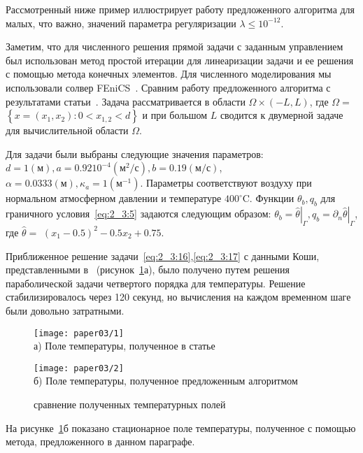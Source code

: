 Рассмотренный ниже пример иллюстрирует работу предложенного
алгоритма для малых, что важно, значений параметра регуляризации
$\lambda \leq 10^{-12}$.


Заметим, что для численного решения прямой задачи с заданным управлением
был использован метод простой итерации для линеаризации задачи и ее решения
с помощью метода конечных элементов.
Для численного моделирования мы использовали солвер FEniCS~\cite{fenics, dolfin}.
Сравним работу предложенного
алгоритма с результатами статьи~\cite{Chebotarev2019Problem}.
Задача рассматривается в области $\Omega \times(-L, L)$,
где $\Omega=$ $\left\{x=\left(x_{1}, x_{2}\right): 0<x_{1,2}<d\right\}$
и при большом $L$ сводится к двумерной задаче для вычислительной
области $\Omega$.

Для задачи были выбраны следующие значения параметров:
$d=1(\text{м}), a=0.9210^{-4}(\text{м}^{2} / \text{с}),
b=0.19(\text{м} / \text{с})$, $\alpha=0.0333(\text{м}),
\kappa_{a}=1\left(\text{м}^{-1}\right)$.
Параметры соответствуют воздуху при нормальном атмосферном давлении
и температуре $400^{\circ} \text{C}$.
Функции $\theta_{b}, q_{b}$ для граничного условия~\eqref{eq:2_3:5}
задаются следующим образом: $\theta_{b}=\left.\widehat{\theta}\right|_{\Gamma},
q_{b}=\left.\partial_{n} \widehat{\theta}\right|_{\Gamma}$,
где $\widehat{\theta}=$ $\left(x_{1}-0.5\right)^{2}-0.5 x_{2}+0.75$.

Приближенное решение задачи~\eqref{eq:2_3:16},\eqref{eq:2_3:17}
с данными Коши, представленными в~\cite{Chebotarev2019Problem}
(рисунок~\ref{fig:4_3:1}а), было получено путем решения параболической задачи
четвертого порядка для температуры.
Решение стабилизировалось через 120 секунд, но
вычисления на каждом временном шаге были
довольно затратными.
\begin{figure}[h!t]
    \begin{minipage}[b][][b]{0.49\linewidth}
        \centering
        \texttt{[image: paper03/1]} \\ а) Поле температуры,
        полученное в статье~\cite{Chebotarev2019Problem}
    \end{minipage}
    \hfill
    \begin{minipage}[b][][b]{0.49\linewidth}
        \centering
        \texttt{[image: paper03/2]} \\
        б) Поле температуры, полученное предложенным алгоритмом
    \end{minipage}
    \caption{сравнение полученных температурных полей}
    \label{fig:4_3:1}
\end{figure}
На рисунке~\ref{fig:4_3:1}б показано стационарное поле температуры,
полученное с помощью метода, предложенного в данном параграфе.

